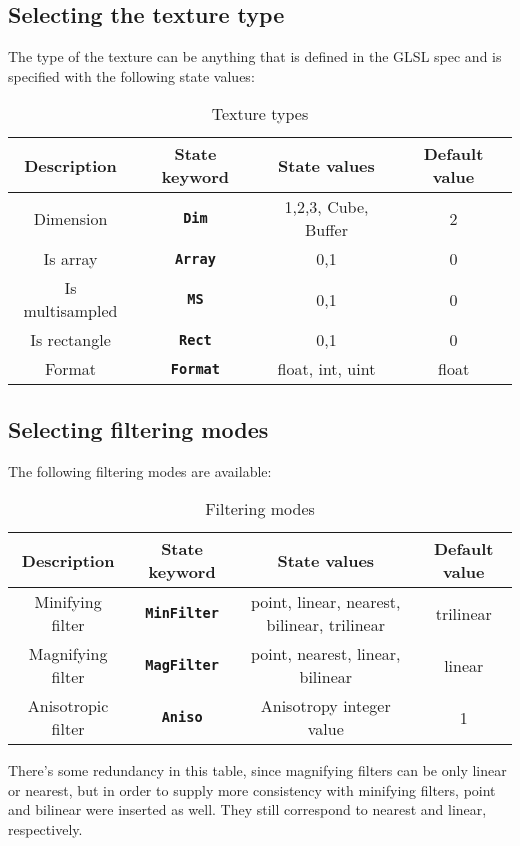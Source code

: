 \documentclass[11pt,a4paper,final,titlepage]{article}
\begin{document}
\subsection{Selecting the texture type}
The type of the texture can be anything that is defined in the GLSL spec and is specified with
the following state values:
\begin{table}[h]
\centering
\begin{tabular}{|c|c|c|c|}
\hline
Description & State keyword & State values & Default value\\
\hline\hline
Dimension & \texttt{\textbf{Dim}} & 1,2,3, Cube, Buffer & 2\\
\hline
Is array & \texttt{\textbf{Array}} & 0,1 & 0\\
\hline
Is multisampled & \texttt{\textbf{MS}} & 0,1 & 0\\
\hline
Is rectangle & \texttt{\textbf{Rect}} & 0,1 & 0\\
\hline
Format & \texttt{\textbf{Format}} & float, int, uint & float\\
\hline
\end{tabular}
\caption{Texture types}
\label{tab:texTypes}
\end{table}

\subsection{Selecting filtering modes}
The following filtering modes are available:
\begin{table}[h]
\centering
\begin{tabulary}{\linewidth}{|C|C|C|C|}
\hline
Description & State keyword & State values & Default value\\
\hline\hline
Minifying filter & \texttt{\textbf{MinFilter}} & point, linear, nearest, bilinear, trilinear & trilinear\\
\hline
Magnifying filter & \texttt{\textbf{MagFilter}} & point, nearest, linear, bilinear & linear\\
\hline
Anisotropic filter & \texttt{\textbf{Aniso}} & Anisotropy integer value & 1\\
\hline
\end{tabulary}
\caption{Filtering modes}
\label{tab:filtModes}
\end{table}

There's some redundancy in this table, since magnifying filters can be only linear or nearest,
but in order to supply more consistency with minifying filters, point and bilinear were inserted
as well. They still correspond to nearest and linear, respectively.
\end{document}
